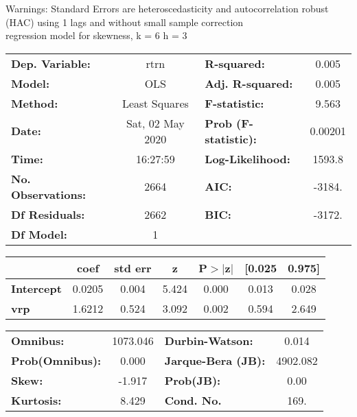 Warnings: \newline
 [1] Standard Errors are heteroscedasticity and autocorrelation robust (HAC) using 1 lags and without small sample correction\\ 

regression model for skewness, k = 6 h = 3\begin{center}
\begin{tabular}{lclc}
\toprule
\textbf{Dep. Variable:}    &       rtrn       & \textbf{  R-squared:         } &     0.005   \\
\textbf{Model:}            &       OLS        & \textbf{  Adj. R-squared:    } &     0.005   \\
\textbf{Method:}           &  Least Squares   & \textbf{  F-statistic:       } &     9.563   \\
\textbf{Date:}             & Sat, 02 May 2020 & \textbf{  Prob (F-statistic):} &  0.00201    \\
\textbf{Time:}             &     16:27:59     & \textbf{  Log-Likelihood:    } &    1593.8   \\
\textbf{No. Observations:} &        2664      & \textbf{  AIC:               } &    -3184.   \\
\textbf{Df Residuals:}     &        2662      & \textbf{  BIC:               } &    -3172.   \\
\textbf{Df Model:}         &           1      & \textbf{                     } &             \\
\bottomrule
\end{tabular}
\begin{tabular}{lcccccc}
                   & \textbf{coef} & \textbf{std err} & \textbf{z} & \textbf{P$> |$z$|$} & \textbf{[0.025} & \textbf{0.975]}  \\
\midrule
\textbf{Intercept} &       0.0205  &        0.004     &     5.424  &         0.000        &        0.013    &        0.028     \\
\textbf{vrp}       &       1.6212  &        0.524     &     3.092  &         0.002        &        0.594    &        2.649     \\
\bottomrule
\end{tabular}
\begin{tabular}{lclc}
\textbf{Omnibus:}       & 1073.046 & \textbf{  Durbin-Watson:     } &    0.014  \\
\textbf{Prob(Omnibus):} &   0.000  & \textbf{  Jarque-Bera (JB):  } & 4902.082  \\
\textbf{Skew:}          &  -1.917  & \textbf{  Prob(JB):          } &     0.00  \\
\textbf{Kurtosis:}      &   8.429  & \textbf{  Cond. No.          } &     169.  \\
\bottomrule
\end{tabular}
\end{center}

